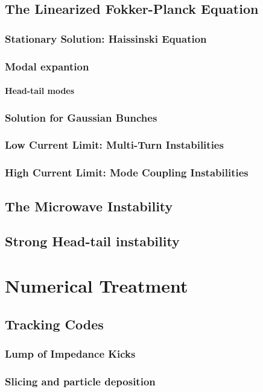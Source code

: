 \documentclass[
	12pt,				%
	openright,			%
	oneside,			%
	a4paper,		%
	chapter=TITLE,		%
	section=TITLE,		%
    brazil,				%
	english,			%
	sumario=tradicional,
	]{abntex2}
\begin{document}
    \subsection{The Linearized Fokker-Planck Equation}
      \subsubsection{Stationary Solution: Haissinski Equation}
      \subsubsection{Modal expantion}
        \paragraph{Head-tail modes}
      \subsubsection{Solution for Gaussian Bunches}
      \subsubsection{Low Current Limit: Multi-Turn Instabilities}
      \subsubsection{High Current Limit: Mode Coupling Instabilities}
    \subsection{The Microwave Instability}
    \subsection{Strong Head-tail instability}
  \section{Numerical Treatment}
    \subsection{Tracking Codes}
      \subsubsection{Lump of Impedance Kicks}
      \subsubsection{Slicing and particle deposition}
\end{document}
